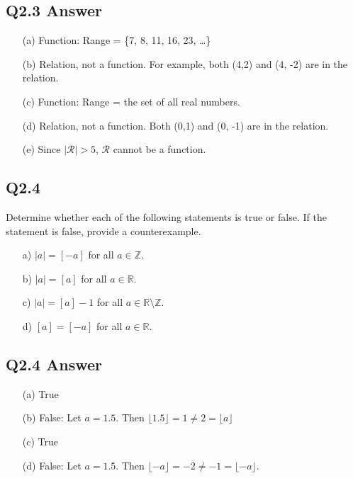 \documentclass{article}
\begin{document}
\subsection*{Q2.3 Answer}
\begin{enumerate}
    \item[(a)] Function: Range = \{7, 8, 11, 16, 23, \ldots\}
    \item[(b)] Relation, not a function. For example, both (4,2) and (4, -2) are in the relation.
    \item[(c)] Function: Range = the set of all real numbers.
    \item[(d)] Relation, not a function. Both (0,1) and (0, -1) are in the relation.
    \item[(e)] Since \( |\mathcal{R}| > 5 \), \( \mathcal{R} \) cannot be a function.
\end{enumerate}
\newpage

\subsection*{Q2.4}
Determine whether each of the following statements is true or false. If the statement is false, provide a counterexample.
\begin{enumerate}
    \item[a)] \( |a| = [-a] \) for all \( a \in \mathbb{Z} \).
    \item[b)] \( |a| = [a] \) for all \( a \in \mathbb{R} \).
    \item[c)] \( |a| = [a] - 1 \) for all \( a \in \mathbb{R} \setminus \mathbb{Z} \).
    \item[d)] \( [a] = [-a] \) for all \( a \in \mathbb{R} \).
\end{enumerate}
\newpage
\subsection*{Q2.4 Answer}
\begin{enumerate}
    \item[(a)] True
    \item[(b)] False: Let \( a = 1.5 \). Then \( \lfloor 1.5 \rfloor = 1 \neq 2 = \lfloor a \rfloor \)
    \item[(c)] True
    \item[(d)] False: Let \( a = 1.5 \). Then \( \lfloor -a \rfloor = -2 \neq -1 = \lfloor -a \rfloor \).
\end{enumerate}
\newpage
\end{document}
